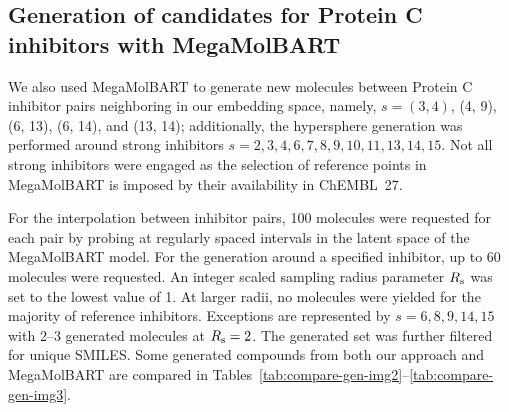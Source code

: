 \documentclass[12pt]{article}
\begin{document}
\subsection*{\sffamily \large Generation of candidates for Protein C inhibitors with MegaMolBART}

We also used MegaMolBART to generate new molecules between Protein C inhibitor pairs neighboring in our embedding space, namely, $s=(3, 4)$, (4, 9), (6, 13), (6, 14), and (13, 14); additionally, the hypersphere generation was performed around strong inhibitors $s=2, 3, 4, 6, 7, 8, 9, 10, 11, 13, 14, 15$.
Not all strong inhibitors were engaged as the selection of reference points in MegaMolBART is imposed by their availability in ChEMBL~27.

For the interpolation between inhibitor pairs, 100 molecules were requested for each pair by probing at regularly spaced intervals in the latent space of the MegaMolBART model.
For the generation around a specified inhibitor, up to 60 molecules were requested. 
An integer scaled sampling radius parameter $R_{\rm s}$ was set to the lowest value of 1.
At larger radii, no molecules were yielded for the majority of reference inhibitors.
Exceptions are represented by $s = 6, 8, 9, 14, 15$ with 2--3 generated molecules at $R_{\rm s} = 2$.
The generated set was further filtered for unique SMILES.
Some generated compounds from both our approach and MegaMolBART are compared in Tables~\ref{tab:compare-gen-img2}--\ref{tab:compare-gen-img3}.
%
\def\imgscale{0.19}
\def\imgscalebig{0.25}
\end{document}
